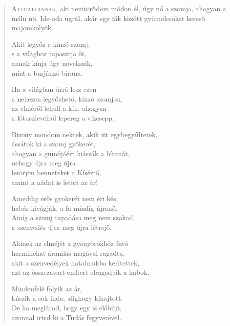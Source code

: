 
\vspace*{-2\baselineskip}
\begin{verse}

{\par%
\lettrine[slope=0.5em]{A}{tudatlannak,} {\LettrineTextFont aki nemtörődöm módon él,}\newline
úgy nő a szomja, ahogyan a málu nő.\newline
Ide-oda ugrál, akár egy fák között\verselinebreak
gyümölcsöket kereső majomkölyök.
\par}

 Akit legyőz e kínzó szomj,\\
s a világhoz tapasztja őt,\\
annak kínja úgy növekszik,\\
mint a burjánzó bírana.

 Ha a világban úrrá lesz ezen\\
a nehezen legyőzhető, kínzó szomjon,\\
az elméről lehull a kín, ahogyan\\
a lótuszlevélről lepereg a vízcsepp.

 Bizony mondom nektek, akik itt egybegyűltetek,\\
ássátok ki a szomj gyökerét,\\
ahogyan a gumójáért kiássák a bíranát,\\
nehogy újra meg újra\\
letörjön benneteket a Kísértő,\\
amint a nádat is letöri az ár!

 Ameddig erős gyökerét nem éri kés,\\
habár kivágják, a fa mindig újranő.\\
Amíg a szomj tapadása meg nem szakad,\\
a szenvedés újra meg újra létrejő.

 Akinek az elméjét a gyönyörökhöz futó\\
harminchat áramlás magával ragadta,\\
akit a szenvedélyek hatalmukba kerítettek,\\
azt az összezavart embert elragadják a habok.

 Mindenfelé folyik az ár,\\
kúszik a sok inda, alighogy kihajtott.\\
De ha meglátod, hogy egy is előbújt,\\
azonnal irtsd ki a Tudás fegyverével.


\end{verse}
